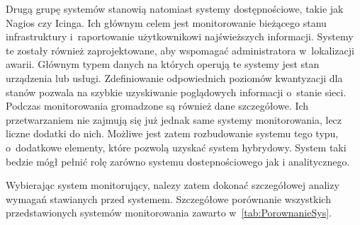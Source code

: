 Drugą grupę systemów stanowią natomiast systemy dostępnościowe, takie
jak Nagios czy Icinga. Ich głównym celem jest monitorowanie bieżącego
stanu infrastruktury i~raportowanie użytkownikowi najświeższych
informacji. Systemy te zostały również zaprojektowane, aby wspomagać
administratora w~lokalizacji awarii. Głównym typem danych na których
operują te systemy jest stan urządzenia lub usługi. Zdefiniowanie
odpowiednich poziomów kwantyzacji dla stanów pozwala na szybkie
uzyskiwanie poglądowych informacji o~stanie sieci. Podczas
monitorowania gromadzone są również dane szczegółowe. Ich
przetwarzaniem nie zajmują się już jednak same systemy monitorowania,
lecz liczne dodatki do nich. Możliwe jest zatem rozbudowanie systemu
tego typu, o~dodatkowe elementy, które pozwolą uzyskać system
hybrydowy. System taki bedzie mógł pełnić rolę zarówno systemu
dostepnościowego jak i analitycznego.

Wybierając system monitorujący, nalezy zatem dokonać szczegółowej
analizy wymagań stawianych przed systemem. Szczegółowe porównanie
wszystkich przedstawionych systemów monitorowania zawarto
w~\ref{tab:PorownanieSys}.

